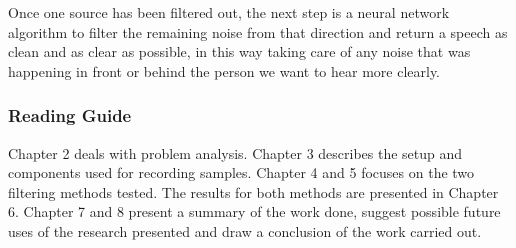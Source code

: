 Once one source has been filtered out, the next step is a neural network algorithm to filter the remaining noise from that direction and return a speech as clean and as clear as possible, in this way taking care of any noise that was happening in front or behind the person we want to hear more clearly.
\subsubsection{Reading Guide}
Chapter 2 deals with problem analysis. Chapter 3 describes the setup and components
used for recording samples. Chapter 4 and 5 focuses on the two filtering methods
tested. The results for both methods are presented in Chapter 6. Chapter 7 and 
8 present a summary of the work done, suggest possible future uses of the research 
presented and draw a conclusion of the work carried out.
